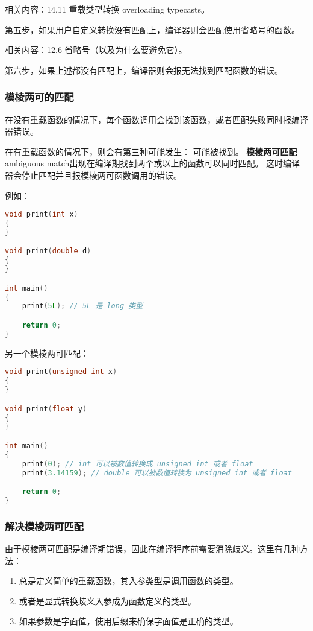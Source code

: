 \documentclass[../../LearnCpp.tex]{subfiles}
\begin{document}
相关内容：14.11 重载类型转换 overloading typecasts。

第五步，如果用户自定义转换没有匹配上，编译器则会匹配使用省略号的函数。

相关内容：12.6 省略号（以及为什么要避免它）。

第六步，如果上述都没有匹配上，编译器则会报无法找到匹配函数的错误。

\subsubsection*{模棱两可的匹配}

在没有重载函数的情况下，每个函数调用会找到该函数，或者匹配失败同时报编译器错误。

在有重载函数的情况下，则会有第三种可能发生： 可能被找到。
\textbf{模棱两可匹配} ambiguous match出现在编译期找到两个或以上的函数可以同时匹配。
这时编译器会停止匹配并且报模棱两可函数调用的错误。

例如：

\begin{lstlisting}[language=C++]
void print(int x)
{
}

void print(double d)
{
}

int main()
{
    print(5L); // 5L 是 long 类型

    return 0;
}
\end{lstlisting}

另一个模棱两可匹配：

\begin{lstlisting}[language=C++]
void print(unsigned int x)
{
}

void print(float y)
{
}

int main()
{
    print(0); // int 可以被数值转换成 unsigned int 或者 float
    print(3.14159); // double 可以被数值转换为 unsigned int 或者 float

    return 0;
}
\end{lstlisting}

\subsubsection*{解决模棱两可匹配}

由于模棱两可匹配是编译期错误，因此在编译程序前需要消除歧义。这里有几种方法：

\begin{enumerate}
  \item 总是定义简单的重载函数，其入参类型是调用函数的类型。
  \item 或者是显式转换歧义入参成为函数定义的类型。
  \item 如果参数是字面值，使用后缀来确保字面值是正确的类型。
\end{enumerate}
\end{document}
